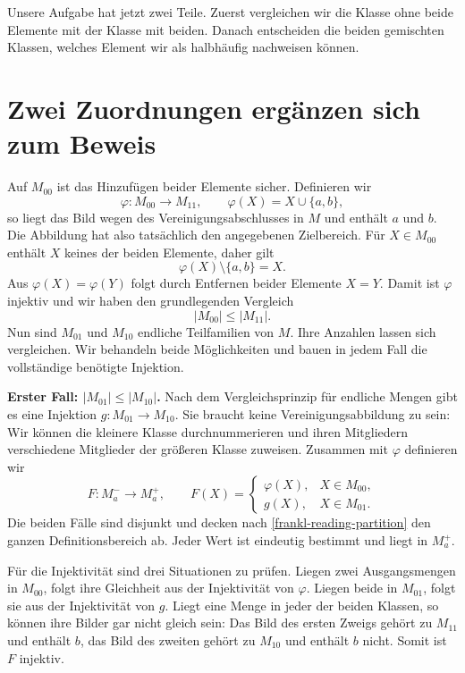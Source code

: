 Unsere Aufgabe hat jetzt zwei Teile. Zuerst vergleichen wir
die Klasse ohne beide Elemente mit der Klasse mit beiden.
Danach entscheiden die beiden gemischten Klassen, welches
Element wir als halbhäufig nachweisen können.

\par{}
\section*{Zwei Zuordnungen ergänzen sich zum Beweis}
\hypertarget{frankl.reading.injection}{}

Auf \(M_{00}\) ist das Hinzufügen beider Elemente sicher.
Definieren wir
\[
  \varphi\colon M_{00}\longrightarrow M_{11},
  \qquad \varphi(X)=X\cup\{a,b\},
\]
so liegt das Bild wegen des Vereinigungsabschlusses in \(M\)
und enthält \(a\) und \(b\). Die Abbildung hat also
tatsächlich den angegebenen Zielbereich. Für \(X\in M_{00}\)
enthält \(X\) keines der beiden Elemente, daher gilt
\[
  \varphi(X)\setminus\{a,b\}=X.
\]
Aus \(\varphi(X)=\varphi(Y)\) folgt durch Entfernen
beider Elemente \(X=Y\). Damit ist \(\varphi\) injektiv
und wir haben den grundlegenden Vergleich
\begin{equation}
  |M_{00}|\leq|M_{11}|.
  \tag{I}\label{frankl-reading-injection}
\end{equation}
Nun sind \(M_{01}\) und \(M_{10}\) endliche Teilfamilien
von \(M\). Ihre Anzahlen lassen sich vergleichen.
Wir behandeln beide Möglichkeiten und bauen in jedem Fall
die vollständige benötigte Injektion.

\medskip\noindent\textbf{Erster Fall: \(|M_{01}|\leq|M_{10}|\).}
Nach dem Vergleichsprinzip für endliche Mengen gibt es eine
Injektion \(g\colon M_{01}\to M_{10}\). Sie braucht keine
Vereinigungsabbildung zu sein: Wir können die kleinere Klasse
durchnummerieren und ihren Mitgliedern verschiedene Mitglieder
der größeren Klasse zuweisen.
Zusammen mit \(\varphi\) definieren wir
\[
  F\colon M_a^-\longrightarrow M_a^+,
  \qquad
  F(X)=
  \begin{cases}
    \varphi(X),&X\in M_{00},\\
    g(X),&X\in M_{01}.
  \end{cases}
\]
Die beiden Fälle sind disjunkt und decken nach
\eqref{frankl-reading-partition} den ganzen Definitionsbereich
ab. Jeder Wert ist eindeutig bestimmt und liegt in \(M_a^+\).

\FranklInjectionDiagram

Für die Injektivität sind drei Situationen zu prüfen.
Liegen zwei Ausgangsmengen in \(M_{00}\), folgt ihre
Gleichheit aus der Injektivität von \(\varphi\).
Liegen beide in \(M_{01}\), folgt sie aus der Injektivität
von \(g\). Liegt eine Menge in jeder der beiden Klassen,
so können ihre Bilder gar nicht gleich sein: Das Bild des
ersten Zweigs gehört zu \(M_{11}\) und enthält \(b\),
das Bild des zweiten gehört zu \(M_{10}\) und enthält
\(b\) nicht. Somit ist \(F\) injektiv.

